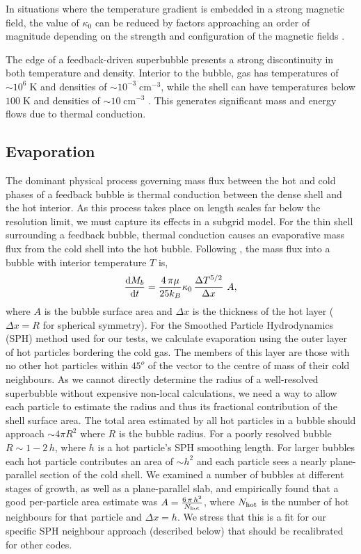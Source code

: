 In situations where the temperature gradient is embedded in a strong magnetic
field, the value of $\kappa_0$  can be reduced by factors approaching an order
of magnitude depending on the strength and configuration of the magnetic fields
\citep{Cowie1977}.

The edge of a feedback-driven superbubble presents a strong discontinuity in
both temperature and density.  Interior to the bubble, gas has temperatures of
$\sim 10^6\;\mathrm{K}$ and densities of $\sim10^{-3}\;\mathrm{cm^{-3}}$, while
the shell can have temperatures below $100\;\mathrm{K}$ and densities of $\sim
10\;\mathrm{cm^{-3}}$ \citep{Chevalier1974}.  This generates significant mass
and energy flows due to thermal conduction.

\subsection{Evaporation}
The dominant physical process governing mass flux between the hot and cold
phases of a feedback bubble is thermal conduction between the dense shell and
the hot interior.   As this process takes place on length scales far below the
resolution limit, we must capture its effects in a subgrid model.  For the thin
shell surrounding a feedback bubble, thermal conduction causes an evaporative
mass flux from the cold shell into the hot bubble.  Following
\citet{MacLow1988}, the mass flux into a bubble with interior temperature $T$
is,
\begin{equation}\label{massflux1}
    \frac{{\rm d }M_b}{{\rm d}t} = \frac{4\,\pi\mu}{25k_B}\kappa_0\,\frac{\Delta T^{5/2}}{\Delta x}\ A,
\end{equation}
where $A$ is the bubble surface area and $\Delta x$ is the thickness of the hot
layer ($\Delta x = R$ for spherical symmetry).  For the Smoothed Particle
Hydrodynamics (SPH) method used for our tests, we calculate evaporation using
the outer layer of hot particles bordering the cold gas.  The members of this
layer are those with no other hot particles within $45^o$ of the vector to the
centre of mass of their cold neighbours.  As we cannot directly determine the
radius of a well-resolved superbubble without expensive non-local calculations,
we need a way to allow each particle to estimate the radius and thus its
fractional contribution of the shell surface area.  The total area estimated by
all hot particles in a bubble should approach $\sim 4\pi R^2$ where $R$ is the
bubble radius.  For a poorly resolved bubble $R \sim 1-2\,h$, where $h$ is a hot
particle's SPH smoothing length.  For larger bubbles each hot particle
contributes an area of $\sim h^2$ and each particle sees a nearly plane-parallel
section of the cold shell.  We examined a number of bubbles at different stages
of growth, as well as a plane-parallel slab, and empirically found that a good
per-particle area estimate was $A = \frac{6\,\pi\,h^2}{N_{\rm hot}}$, where
$N_{\rm hot}$ is the number of hot neighbours for that particle and $\Delta x =
h$.  We stress that this is a fit for our specific SPH neighbour approach
(described below) that should be recalibrated for other codes.


